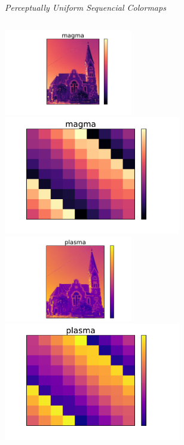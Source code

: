 \documentclass{beamer}
\begin{document}
\begin{frame}
\begin{center}
\textit{Perceptually Uniform Sequencial Colormaps}
\end{center}
\begin{columns}
\begin{column}{0.5\textwidth}
\begin{center}
\vfill
\includegraphics[width=0.42\textwidth]{../church_magma.pdf}
\includegraphics[width=0.58\textwidth]{../magicsquare_magma.pdf}\newline\newline
\vfill
\includegraphics[width=0.42\textwidth]{../church_plasma.pdf}
\includegraphics[width=0.58\textwidth]{../magicsquare_plasma.pdf}
\vfill
\end{center}

\end{column}
\end{columns}
\end{frame}
\end{document}
